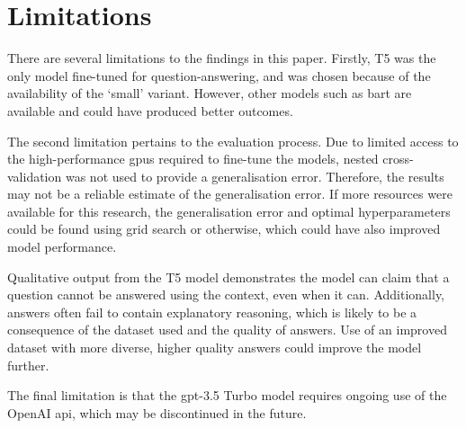 \section{Limitations}
There are several limitations to the findings in this paper. Firstly, T5 was the only model fine-tuned for question-answering, and was chosen because of the availability of the `small' variant. However, other models such as \acrshort{bart} are available and could have produced better outcomes.

The second limitation pertains to the evaluation process. Due to limited access to the high-performance \acrshort{gpu}s required to fine-tune the models, nested cross-validation was not used to provide a generalisation error. Therefore, the results may not be a reliable estimate of the generalisation error. If more resources were available for this research, the generalisation error and optimal hyperparameters could be found using grid search or otherwise, which could have also improved model performance.

Qualitative output from the T5 model demonstrates the model can claim that a question cannot be answered using the context, even when it can. Additionally, answers often fail to contain explanatory reasoning, which is likely to be a consequence of the dataset used and the quality of answers. Use of an improved dataset with more diverse, higher quality answers could improve the model further. 

The final limitation is that the \acrshort{gpt}-3.5 Turbo model requires ongoing use of the OpenAI \acrshort{api}, which may be discontinued in the future.